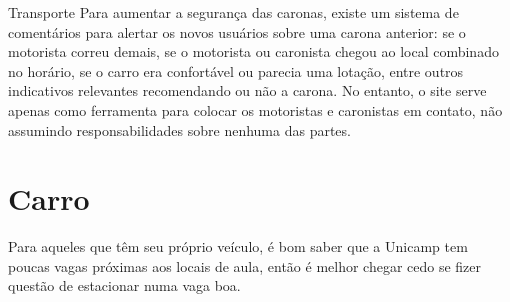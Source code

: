 \begin{story}{Transporte}
Para aumentar a segurança das caronas, existe um sistema de comentários para alertar os novos usuários sobre uma carona anterior: se o motorista correu demais, se o motorista ou caronista chegou ao local combinado no horário, se o carro era confortável ou parecia uma lotação, entre outros indicativos relevantes recomendando ou não a carona. No entanto, o site serve apenas como ferramenta para colocar os motoristas e caronistas em contato, não assumindo responsabilidades sobre nenhuma das partes.

\section*{Carro}

Para aqueles que têm seu próprio veículo, é bom saber que a Unicamp tem poucas vagas próximas aos locais de aula, então é melhor chegar cedo se fizer questão de estacionar numa vaga boa.

\end{story}